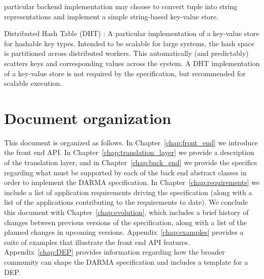 \begin{compactdesc}
particular backend implementation may choose to convert
\gls{tuple} into string representations and implement a simple string-based
\gls{key-value store}.
\item [Distributed Hash Table (DHT)]: A particular implementation of a
  \gls{key-value store} for hashable key types.
Intended to be scalable for large systems, the hash space is partitioned
across distributed workers.
This automatically (and predictably) scatters keys and corresponding
values across the system.
A  DHT implementation of a \gls{key-value store} is not required by the specification,
but recommended for scalable execution.
\end{compactdesc}









\section{Document organization}
\label{sec:organization}
This document is organized as follows.  In Chapter~\ref{chap:front_end} we
introduce the \gls{front end} \gls{API}.  In
Chapter~\ref{chap:translation_layer} we
provide a description of the \gls{translation layer}, and in
Chapter~\ref{chap:back_end} we provide the specifics regarding what must be
supported by each of the \gls{back end} abstract classes in order to implement
the \gls{DARMA} specification. In Chapter~\ref{chap:requirements} we include a list
of application requirements driving the specification (along with a list of the
    applications contributing to the requirements to date).
We conclude this document with
Chapter~\ref{chap:evolution}, which includes a brief history of changes between
previous versions of the specification, along with a list of the planned changes 
in upcoming versions.
Appendix~\ref{chap:examples} provides a suite of examples that illustrate the
 \gls{front end} \gls{API} features. 
Appendix~\ref{chap:DEP} provides information regarding how the broader
community can shape the \gls{DARMA} specification and includes a template for 
a \gls{DEP}. 

